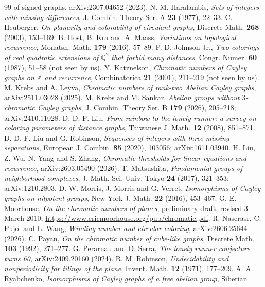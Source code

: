 \documentclass[11pt,a4paper]{amsart}
\theoremstyle{definition}
\newcommand{\Q}{\mathbb{Q}}
\newcommand{\Z}{\mathbb{Z}}
\begin{document}
\begin{thebibliography}{99}
{of signed graphs}, arXiv:2307.04652 (2023).
 N. M. Haralambis, \emph{Sets of integers with missing differences}, J. Combin. Theory Ser. A
\textbf{23} (1977), 22--33.
 C. Heuberger, \emph{On planarity and colorability of circulant graphs}, Discrete Math.
\textbf{268} (2003), 153--169.
 B. Host, B. Kra and A. Maass, \emph{Variations on topological recurrence}, Monatsh. Math.
\textbf{179} (2016), 57--89.
 P. D. Johnson Jr., \emph{Two-colorings of real quadratic extensions of $\Q^2$ that forbid
many distances}, Congr. Numer. \textbf{60} (1987), 51--58 (not seen by us).
 Y. Katznelson, \emph{Chromatic numbers of Cayley graphs on $\Z$ and recurrence},
Combinatorica \textbf{21} (2001), 211--219 (not seen by us).
 M. Krebs and A. Leyva, \emph{Chromatic numbers of rank-two Abelian Cayley graphs}, arXiv:2511.03028
(2025).
 M. Krebs and M. Sankar, \emph{Abelian groups without $3$-chromatic Cayley graphs}, J. Combin. Theory
Ser. B \textbf{179} (2026), 205--218; arXiv:2410.11028.
 D. D.-F. Liu, \emph{From rainbow to the lonely runner: a survey on coloring parameters of distance
graphs}, Taiwanese J. Math. \textbf{12} (2008), 851--871.
 D. D.-F. Liu and G. Robinson, \emph{Sequences of integers with three missing separations}, European J.
Combin. \textbf{85} (2020), 103056; arXiv:1611.03940.
 H. Liu, Z. Wu, N. Yang and S. Zhang, \emph{Chromatic thresholds for linear equations and
recurrence}, arXiv:2603.05490 (2026).
 T. Matsushita, \emph{Fundamental groups of neighborhood complexes}, J. Math. Sci. Univ.
Tokyo \textbf{24} (2017), 321--353; arXiv:1210.2803.
 D. W. Morris, J. Morris and G. Verret, \emph{Isomorphisms of Cayley graphs on nilpotent groups}, New
York J. Math. \textbf{22} (2016), 453--467.
 G. E. Moorhouse, \emph{On the chromatic numbers of planes}, preliminary draft, revised
3 March 2010, \url{https://www.ericmoorhouse.org/pub/chromatic.pdf}.
 R. Naserasr, C. Pujol and L. Wang, \emph{Winding number and circular coloring}, arXiv:2606.25644
(2026).
 C. Payan, \emph{On the chromatic number of cube-like graphs}, Discrete Math. \textbf{103} (1992),
271--277.
 G. Perarnau and O. Serra, \emph{The lonely runner conjecture turns 60}, arXiv:2409.20160 (2024).
 R. M. Robinson, \emph{Undecidability and nonperiodicity for tilings of the plane}, Invent.
Math. \textbf{12} (1971), 177--209.
 A. A. Ryabchenko, \emph{Isomorphisms of Cayley graphs of a free abelian group}, Siberian

\end{thebibliography}
\end{document}
